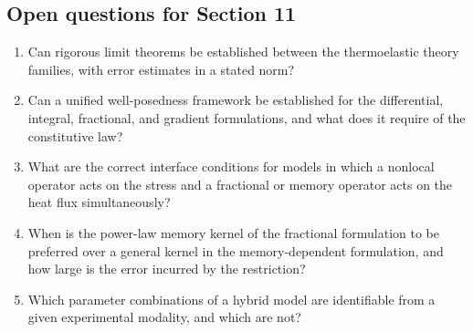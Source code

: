 \subsection{Open questions for Section 11}

\begin{enumerate}[label=\textbf{OQ11.\arabic*}]
\item Can rigorous limit theorems be established between the thermoelastic theory families, with error estimates in a stated norm? \label{oq:11.1}
\item Can a unified well-posedness framework be established for the differential, integral, fractional, and gradient formulations, and what does it require of the constitutive law? \label{oq:11.2}
\item What are the correct interface conditions for models in which a nonlocal operator acts on the stress and a fractional or memory operator acts on the heat flux simultaneously? \label{oq:11.3}
\item When is the power-law memory kernel of the fractional formulation to be preferred over a general kernel in the memory-dependent formulation, and how large is the error incurred by the restriction? \label{oq:11.4}
\item Which parameter combinations of a hybrid model are identifiable from a given experimental modality, and which are not? \label{oq:11.5}
\end{enumerate}

